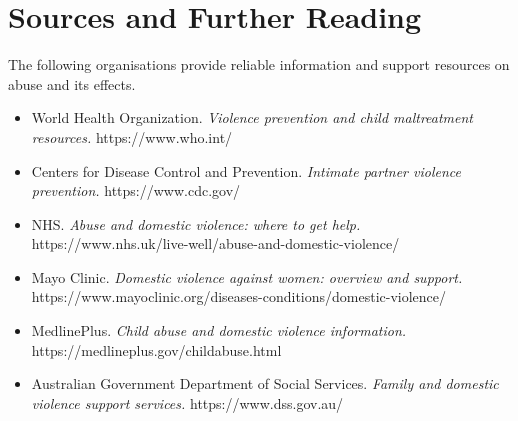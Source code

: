\section*{Sources and Further Reading}
The following organisations provide reliable information and support resources on abuse and its effects.

\begin{itemize}
    \item World Health Organization. \textit{Violence prevention and child maltreatment resources.} https://www.who.int/
    \item Centers for Disease Control and Prevention. \textit{Intimate partner violence prevention.} https://www.cdc.gov/
    \item NHS. \textit{Abuse and domestic violence: where to get help.} https://www.nhs.uk/live-well/abuse-and-domestic-violence/
    \item Mayo Clinic. \textit{Domestic violence against women: overview and support.} https://www.mayoclinic.org/diseases-conditions/domestic-violence/
    \item MedlinePlus. \textit{Child abuse and domestic violence information.} https://medlineplus.gov/childabuse.html
    \item Australian Government Department of Social Services. \textit{Family and domestic violence support services.} https://www.dss.gov.au/
\end{itemize}
